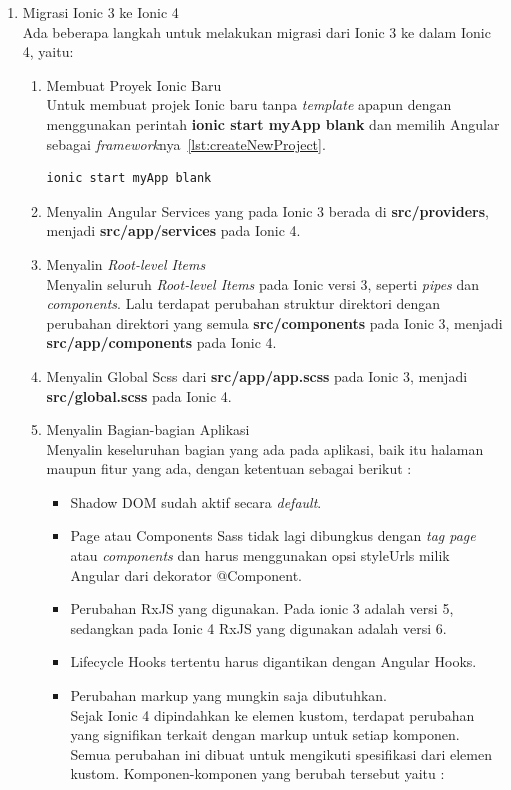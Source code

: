\begin{enumerate}
	\item Migrasi Ionic 3 ke Ionic 4 \\
	Ada beberapa langkah untuk melakukan migrasi dari Ionic 3 ke dalam Ionic 4, yaitu:
	

	\begin{enumerate}
		\item Membuat Proyek Ionic Baru \\
		Untuk membuat projek Ionic baru tanpa {\it template} apapun dengan menggunakan perintah \textbf{ionic start myApp blank} dan memilih Angular sebagai {\it framework}nya~\ref{lst:createNewProject}.
\begin{lstlisting}[label={lst:createNewProject}, caption=Perintah Membuat Proyek Ionic Baru]
ionic start myApp blank
\end{lstlisting}

		\item Menyalin Angular Services yang pada Ionic 3 berada di \textbf{src/providers}, menjadi \textbf{src/app/services} pada Ionic 4.

		\item Menyalin {\it Root-level Items} \\
		Menyalin seluruh {\it Root-level Items} pada Ionic versi 3, seperti \textit{pipes} dan \textit{components}. Lalu terdapat perubahan struktur direktori dengan perubahan direktori yang semula \textbf{src/components} pada Ionic 3, menjadi \textbf{src/app/components} pada Ionic 4.

		\item Menyalin Global Scss dari \textbf{src/app/app.scss} pada Ionic 3, menjadi \textbf{src/global.scss} pada Ionic 4.

		\item Menyalin Bagian-bagian Aplikasi \\
		Menyalin keseluruhan bagian yang ada pada aplikasi, baik itu halaman maupun fitur yang ada, dengan ketentuan sebagai berikut :
\newpage
		\begin{itemize}
			\item Shadow DOM sudah aktif secara {\it default}.
			\item Page atau Components Sass tidak lagi dibungkus dengan \textit{tag page} atau \textit{components} dan harus menggunakan opsi styleUrls milik Angular dari dekorator @Component.
			\item Perubahan RxJS yang digunakan. Pada ionic 3 adalah versi 5, sedangkan pada Ionic 4 RxJS yang digunakan adalah versi 6.
			\item Lifecycle Hooks tertentu harus digantikan dengan Angular Hooks.
			\item Perubahan markup yang mungkin saja dibutuhkan. \\
			Sejak Ionic 4 dipindahkan ke elemen kustom, terdapat perubahan yang signifikan terkait dengan markup untuk setiap komponen. Semua perubahan ini dibuat untuk mengikuti spesifikasi dari elemen kustom. Komponen-komponen yang berubah tersebut yaitu :


\end{itemize}
\end{enumerate}
\end{enumerate}
